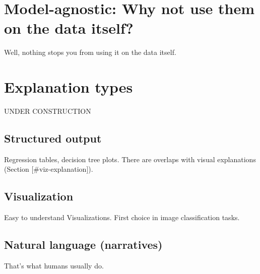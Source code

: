 \documentclass[12pt,]{krantz}
\theoremstyle{definition}
\theoremstyle{definition}
\theoremstyle{definition}
\theoremstyle{remark}
\begin{document}
\section{Model-agnostic: Why not use them on the data
itself?}\label{model-agnostic-why-not-use-them-on-the-data-itself}

Well, nothing stops you from using it on the data itself.

\section{Explanation types}\label{explanation-types}

UNDER CONSTRUCTION

\subsection{Structured output}\label{structured-output}

Regression tables, decision tree plots. There are overlaps with visual
explanations (Section {[}\#viz-explanation{]}).

\subsection{Visualization}\label{viz-explanation}

Easy to understand Visualizations. First choice in image classification
tasks.

\subsection{Natural language
(narratives)}\label{natural-language-narratives}

That's what humans usually do.



\backmatter
\end{document}
